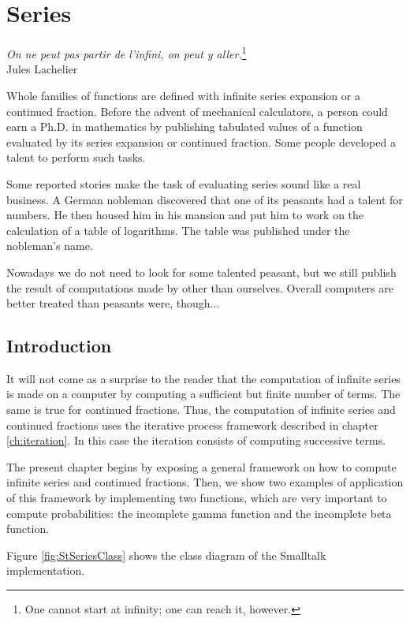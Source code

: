 \documentclass[twoside]{book}
\begin{document}
\fi

\chapter{Series}
\label{ch:series}
\begin{flushright}
{\sl On ne peut pas partir de l'infini, on peut y
aller.}\footnote{One cannot start at infinity; one can reach it,
however.}\\ Jules Lachelier
\end{flushright}
\vspace{1 ex} Whole families of functions are defined with
infinite series expansion or a continued fraction. Before the
advent of mechanical calculators, a person could earn a Ph.D. in
mathematics by publishing tabulated values of a function evaluated
by its series expansion or continued fraction. Some people
developed a talent to perform such tasks.

Some reported stories make the task of evaluating series sound
like a real business. A German nobleman discovered that one of its
peasants had a talent for numbers. He then housed him in his
mansion and put him to work on the calculation of a table of
logarithms. The table was published under the nobleman's
name\cite{Ifrah}.

Nowadays we do not need to look for some talented peasant, but we
still publish the result of computations made by other than
ourselves. Overall computers are better treated than peasants
were, though$\ldots$

\section{Introduction}
It will not come as a surprise to the reader that the computation
of infinite series is made on a computer by computing a sufficient
but finite number of terms. The same is true for continued
fractions. Thus, the computation of infinite series and continued
fractions uses the iterative process framework described in
chapter \ref{ch:iteration}. In this case the iteration consists of
computing successive terms.

The present chapter begins by exposing a general framework on how
to compute infinite series and continued fractions. Then, we show
two examples of application of this framework by implementing two
functions, which are very important to compute probabilities: the
incomplete gamma function and the incomplete beta function.

Figure \ref{fig:StSeriesClass} shows the class diagram of the Smalltalk
implementation.
\end{document}

